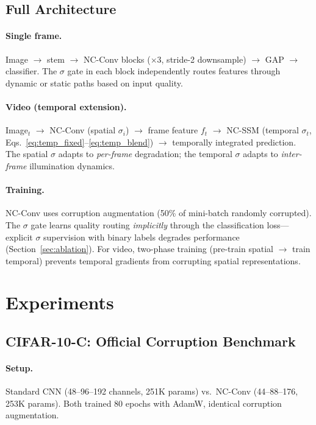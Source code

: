 \documentclass[10pt,twocolumn,letterpaper]{article}
\begin{document}
\subsection{Full Architecture}
\label{sec:fullarch}

\paragraph{Single frame.}
Image $\to$ stem $\to$ NC-Conv blocks ($\times 3$, stride-2 downsample) $\to$ GAP $\to$ classifier.
The $\sigma$ gate in each block independently routes features through dynamic or static paths based on input quality.

\paragraph{Video (temporal extension).}
Image$_t$ $\to$ NC-Conv (spatial $\sigma_i$) $\to$ frame feature $f_t$ $\to$ NC-SSM (temporal $\sigma_t$, Eqs.~\ref{eq:temp_fixed}--\ref{eq:temp_blend}) $\to$ temporally integrated prediction.
The spatial $\sigma$ adapts to \emph{per-frame} degradation; the temporal $\sigma$ adapts to \emph{inter-frame} illumination dynamics.

\paragraph{Training.}
NC-Conv uses corruption augmentation (50\% of mini-batch randomly corrupted).
The $\sigma$ gate learns quality routing \emph{implicitly} through the classification loss---explicit $\sigma$ supervision with binary labels degrades performance (Section~\ref{sec:ablation}).
For video, two-phase training (pre-train spatial $\to$ train temporal) prevents temporal gradients from corrupting spatial representations.


\section{Experiments}
\label{sec:experiments}

\subsection{CIFAR-10-C: Official Corruption Benchmark}
\label{sec:cifar10c}

\paragraph{Setup.}
Standard CNN (48--96--192 channels, 251K params) vs.\ NC-Conv (44--88--176, 253K params).
Both trained 80 epochs with AdamW, identical corruption augmentation.
\end{document}
